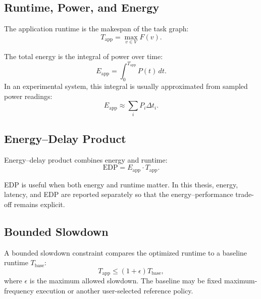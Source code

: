 \subsection{Runtime, Power, and Energy}
\label{subsec:runtime_power_energy}

The application runtime is the makespan of the task graph:
\begin{equation}
T_{\mathrm{app}} = \max_{v \in V} F(v).
\label{eq:application_runtime}
\end{equation}

The total energy is the integral of power over time:
\begin{equation}
E_{\mathrm{app}} = \int_0^{T_{\mathrm{app}}} P(t)\,dt.
\label{eq:application_energy_integral}
\end{equation}
In an experimental system, this integral is usually approximated from sampled power readings:
\begin{equation}
E_{\mathrm{app}} \approx \sum_i P_i \Delta t_i.
\label{eq:application_energy_sampled}
\end{equation}

\subsection{Energy--Delay Product}
\label{subsec:edp_metrics}

Energy--delay product combines energy and runtime:
\begin{equation}
\mathrm{EDP} = E_{\mathrm{app}} \cdot T_{\mathrm{app}}.
\label{eq:edp}
\end{equation}

EDP is useful when both energy and runtime matter. In this thesis, energy,
latency, and EDP are reported separately so that the energy--performance
trade-off remains explicit.

\subsection{Bounded Slowdown}
\label{subsec:bounded_slowdown}

A bounded slowdown constraint compares the optimized runtime to a baseline runtime $T_{\mathrm{base}}$:
\begin{equation}
T_{\mathrm{app}} \leq (1 + \epsilon) T_{\mathrm{base}},
\label{eq:bounded_slowdown}
\end{equation}
where $\epsilon$ is the maximum allowed slowdown. The baseline may be fixed maximum-frequency execution or another user-selected reference policy.

